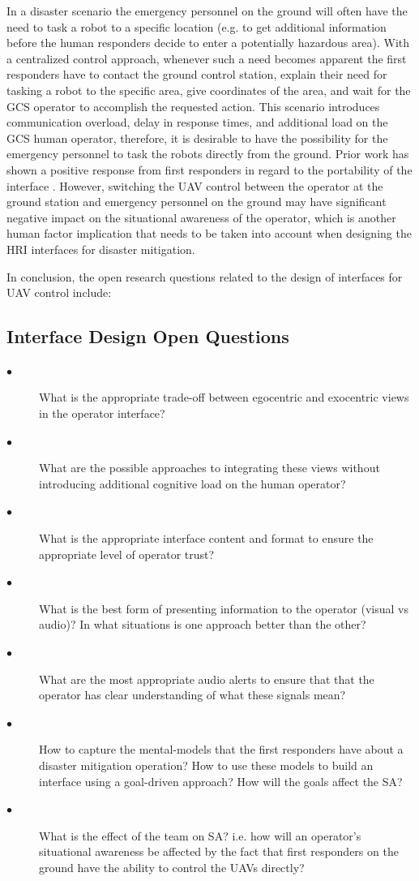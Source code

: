 \documentclass[12pt, letterpaper, oneside]{article}
\begin{document}
In a disaster scenario the emergency personnel on the ground will often have the need to task a robot to a specific location (e.g. to get additional information before the human responders decide to enter a potentially hazardous area). With a centralized control approach, whenever such a need becomes apparent the first responders have to contact the ground control station, explain their need for tasking a robot to the specific area, give coordinates of the area, and wait for the GCS operator to accomplish the requested action. This scenario introduces communication overload, delay in response times, and additional load on the GCS human operator, therefore, it is desirable to have the possibility for the emergency personnel to task the robots directly from the ground. Prior work has shown a positive response from first responders in regard to the portability of the interface \cite{25}. However, switching the UAV control between the operator at the ground station and emergency personnel on the ground may have significant negative impact on the situational awareness of the operator, which is another human factor implication that needs to be taken into account when designing the HRI interfaces for disaster mitigation. 

In conclusion, the open research questions related to the design of interfaces for UAV control include: 
\subsection{Interface Design Open Questions}
\begin{description}

	\item[$\bullet$] 
	What is the appropriate trade-off between egocentric and exocentric views in the operator interface? 
	\item[$\bullet$] 
	What are the possible approaches to integrating these views without introducing additional cognitive load on the human operator?
	\item[$\bullet$] 
	What is the appropriate interface content and format to ensure the appropriate level of operator trust? 
	\item[$\bullet$] 
	What is the best form of presenting information to the operator (visual vs audio)? In what situations is one approach better than the other?
	\item[$\bullet$] 
	What are the most appropriate audio alerts to ensure that that the operator has clear understanding of what these signals mean? 
	\item[$\bullet$] 
	How to capture the mental-models that the first responders have about a disaster mitigation operation? How to use these models to build an interface using a goal-driven approach? How will the goals affect the SA? 
	\item[$\bullet$] 
	What is the effect of the team on SA? i.e. how will an operator's situational awareness be affected by the fact that first responders on the ground have the ability to control the UAVs directly? 
	
\end{description}
\end{document}
